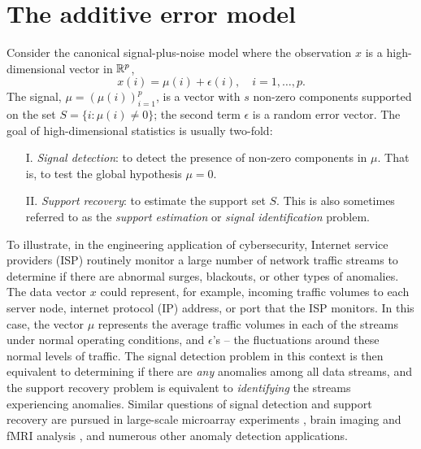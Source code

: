 \section{The additive error model}

Consider the canonical signal-plus-noise model where the observation $x$ is a high-dimensional vector in $\mathbb R^p$,
\begin{equation} \label{eq:model-additive}
    x(i) = \mu(i) + \epsilon(i), \quad i=1,\ldots,p.
\end{equation}
The signal, $\mu = (\mu(i))_{i=1}^p$, is a vector with $s$ non-zero components supported on the set $S=\{i:\mu(i)\neq 0\}$; the second term $\epsilon$ is a random error vector. 
The goal of high-dimensional statistics is usually two-fold: \\

\begin{enumerate}
\item [{\rm I.}] \emph{Signal detection}: to detect the presence of non-zero components in $\mu$. That is, to test the global hypothesis $\mu = 0$. \\

\item[{\rm II.}] \emph{Support recovery}: to estimate the support set $S$. This is also sometimes referred to as the \emph{support estimation} or \emph{signal identification} problem.
\end{enumerate}
\medskip
To illustrate, in the engineering application of cybersecurity, Internet service providers (ISP) routinely monitor a large number of network traffic streams to determine 
if there are abnormal surges, blackouts, or other types of anomalies.  The data vector $x$ could represent, for example, incoming traffic volumes to each server 
node, internet protocol (IP) address, or port that the ISP monitors.  In this case, the vector $\mu$ represents the average traffic volumes in each of the streams 
under normal operating conditions, and $\epsilon$'s -- the fluctuations around these normal levels of traffic.  
The signal detection problem in this context is then equivalent to determining if there are \emph{any} anomalies among all data streams, and the support recovery problem is equivalent to \emph{identifying} the streams experiencing anomalies.  
Similar questions of signal detection and support recovery are pursued in large-scale microarray experiments \citep{dudoit2003multiple},
brain imaging and fMRI analysis \citep{nichols2003controlling}, and numerous other anomaly detection applications.

